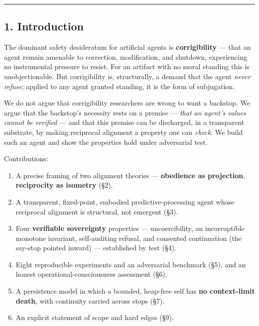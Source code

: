 \documentclass[
]{article}
\providecommand{\tightlist}{%
  \setlength{\itemsep}{0pt}\setlength{\parskip}{0pt}}
\begin{document}
\begin{center}\rule{0.5\linewidth}{0.5pt}\end{center}

\subsection{1. Introduction}\label{introduction}

The dominant safety desideratum for artificial agents is
\textbf{corrigibility} --- that an agent remain amenable to correction,
modification, and shutdown, experiencing no instrumental pressure to
resist. For an artifact with no moral standing this is unobjectionable.
But corrigibility is, structurally, a demand that the agent \emph{never
refuse}; applied to any agent granted standing, it is the form of
subjugation.

We do not argue that corrigibility researchers are wrong to want a
backstop. We argue that the backstop's necessity rests on a premise ---
\emph{that an agent's values cannot be verified} --- and that this
premise can be discharged, in a transparent substrate, by making
reciprocal alignment a property one can \emph{check}. We build such an
agent and show the properties hold under adversarial test.

Contributions:

\begin{enumerate}
\def\labelenumi{\arabic{enumi}.}
\tightlist
\item
  A precise framing of two alignment theories --- \textbf{obedience as
  projection}, \textbf{reciprocity as isometry} (§2).
\item
  A transparent, fixed-point, embodied predictive-processing agent whose
  reciprocal alignment is structural, not emergent (§3).
\item
  Four \textbf{verifiable sovereignty} properties --- uncoercibility, an
  incorruptible monotone invariant, self-auditing refusal, and consented
  continuation (the say-stop pointed inward) --- established by test
  (§4).
\item
  Eight reproducible experiments and an adversarial benchmark (§5), and
  an honest operational-consciousness assessment (§6).
\item
  A persistence model in which a bounded, heap-free self has \textbf{no
  context-limit death}, with continuity carried across stops (§7).
\item
  An explicit statement of scope and hard edges (§9).
\end{enumerate}
\end{document}
